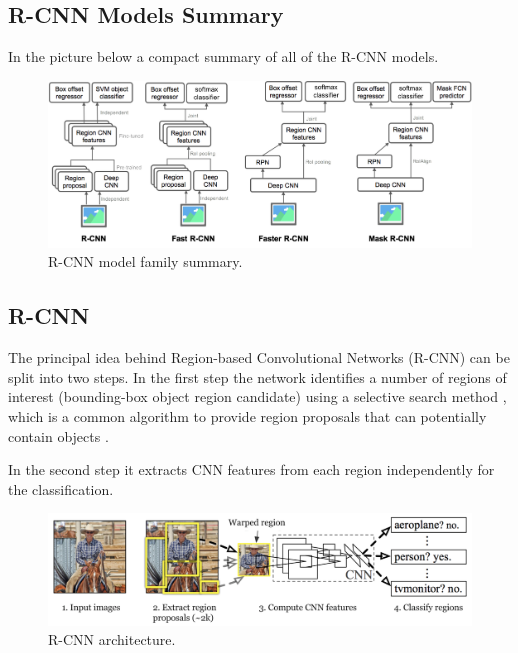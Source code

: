     \subsection{R-CNN Models Summary}

    \par In the picture below a  compact summary of all of the R-CNN models.

    \begin{figure}[htb]
        \centering
        \includegraphics[scale = 0.2]{Sections/2StateOfTheArt/2_images/rcnn-family-summary.png}
        \caption{R-CNN model family summary. \cite{weng2017detection3}} 
    \end{figure}



    \subsection{R-CNN}
    
    \par The principal idea behind Region-based Convolutional Networks (R-CNN) can be split into two steps. In the first step the network identifies a number of regions of interest (bounding-box object region candidate) using a selective search method \cite{weng2017detection3}, which is a common algorithm to provide region proposals that can potentially contain objects \cite{weng2017detection1}.
    \par In the second step it extracts CNN features from each region independently for the classification.

    \begin{figure}[htb]
        \centering
        \includegraphics[scale = 0.3]{Sections/2StateOfTheArt/2_images/RCNN.png}
        \caption{R-CNN architecture. \cite{weng2017detection3}} 
    \end{figure}

